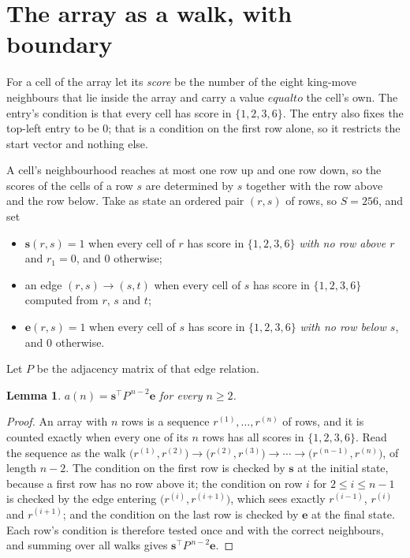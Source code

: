 \documentclass[11pt,a4paper]{article}
\theoremstyle{plain}
\newtheorem{lemma}[theorem]{Lemma}
\theoremstyle{definition}
\begin{document}
\section{The array as a walk, with boundary}

For a cell of the array let its \emph{score} be the number of the eight king-move neighbours that lie inside
the array and carry a value $equal to$ the cell's own. The entry's condition is that every cell
has score in $\{1,2,3,6\}$. The entry also fixes the top-left entry to be $0$; that is a condition on the first row alone, so it restricts the start vector and nothing else.

A cell's neighbourhood reaches at most one row up and one row down, so the scores of the
cells of a row $s$ are determined by $s$ together with the row above and the row below.
Take as state an ordered pair $(r,s)$ of rows, so $S=256$, and set
\begin{itemize}
\item $\mathbf{s}(r,s)=1$ when every cell of $r$ has score in $\{1,2,3,6\}$ \emph{with no row
above $r$} and $r_1=0$, and $0$ otherwise;
\item an edge $(r,s)\to(s,t)$ when every cell of $s$ has score in $\{1,2,3,6\}$ computed from
$r$, $s$ and $t$;
\item $\mathbf{e}(r,s)=1$ when every cell of $s$ has score in $\{1,2,3,6\}$ \emph{with no row
below $s$}, and $0$ otherwise.
\end{itemize}
Let $P$ be the adjacency matrix of that edge relation.

\begin{lemma}\label{lem:walk}
$a(n)=\mathbf{s}^{\!\top}P^{\,n-2}\mathbf{e}$ for every $n\ge2$.
\end{lemma}

\begin{proof}
An array with $n$ rows is a sequence $r^{(1)},\dots,r^{(n)}$ of rows, and it is counted
exactly when every one of its $n$ rows has all scores in $\{1,2,3,6\}$. Read the sequence as the
walk $\bigl(r^{(1)},r^{(2)}\bigr)\to\bigl(r^{(2)},r^{(3)}\bigr)\to\cdots\to
\bigl(r^{(n-1)},r^{(n)}\bigr)$, of length $n-2$. The condition on the first row is
checked by $\mathbf{s}$ at the initial state, because a first row has no row above it; the
condition on row $i$ for $2\le i\le n-1$ is checked by the edge entering
$\bigl(r^{(i)},r^{(i+1)}\bigr)$, which sees exactly $r^{(i-1)}$, $r^{(i)}$ and
$r^{(i+1)}$; and the condition on the last row is checked by $\mathbf{e}$ at the final
state. Each row's condition is therefore tested once and with the correct neighbours, and
summing over all walks gives $\mathbf{s}^{\!\top}P^{\,n-2}\mathbf{e}$.
\end{proof}
\end{document}
